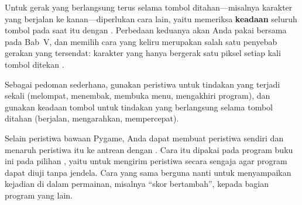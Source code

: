 Untuk gerak yang berlangsung terus selama tombol ditahan---misalnya karakter
yang berjalan ke kanan---diperlukan cara lain, yaitu memeriksa
\textbf{keadaan} seluruh tombol pada saat itu dengan
. Perbedaan keduanya akan Anda pakai bersama
pada Bab~V, dan memilih cara yang keliru merupakan salah satu penyebab
gerakan yang tersendat: karakter yang hanya bergerak satu piksel setiap kali
tombol ditekan \cite{pygame-docs}.

Sebagai pedoman sederhana, gunakan peristiwa untuk tindakan yang terjadi
sekali (melompat, menembak, membuka menu, mengakhiri program), dan gunakan
keadaan tombol untuk tindakan yang berlangsung selama tombol ditahan
(berjalan, mengarahkan, mempercepat).

\begin{catatabox}
Selain peristiwa bawaan Pygame, Anda dapat membuat peristiwa sendiri dan
menaruh peristiwa itu ke antrean dengan . Cara itu
dipakai pada program buku ini pada pilihan , yaitu untuk
mengirim peristiwa  secara sengaja agar program dapat diuji tanpa
jendela. Cara yang sama berguna nanti untuk menyampaikan kejadian di dalam
permainan, misalnya ``skor bertambah'', kepada bagian program yang lain.
\end{catatabox}
